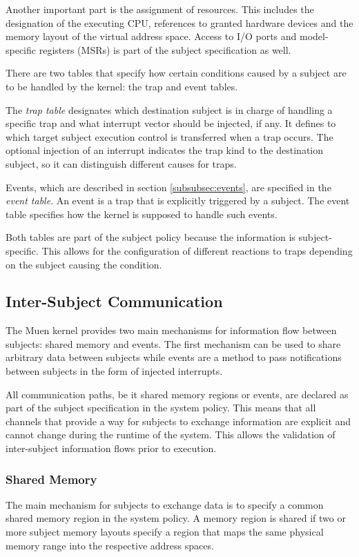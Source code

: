 Another important part is the assignment of resources. This includes the
designation of the executing CPU, references to granted hardware devices and the
memory layout of the virtual address space. Access to I/O ports and
model-specific registers (MSRs) is part of the subject specification as well.

There are two tables that specify how certain conditions caused by a subject
are to be handled by the kernel: the trap and event tables.

The \emph{trap table} designates which destination subject is in charge of
handling a specific trap and what interrupt vector should be injected, if any.
It defines to which target subject execution control is transferred when a trap
occurs. The optional injection of an interrupt indicates the trap kind to the
destination subject, so it can distinguish different causes for traps.

Events, which are described in section \ref{subsubsec:events}, are specified in
the \emph{event table}. An event is a trap that is explicitly triggered by a
subject. The event table specifies how the kernel is supposed to handle such
events.

Both tables are part of the subject policy because the information is
subject-specific. This allows for the configuration of different reactions to
traps depending on the subject causing the condition.

\subsection{Inter-Subject Communication}
The Muen kernel provides two main mechanisms for information flow between
subjects: shared memory and events. The first mechanism can be used to share
arbitrary data between subjects while events are a method to pass notifications
between subjects in the form of injected interrupts.

All communication paths, be it shared memory regions or events, are declared as
part of the subject specification in the system policy. This means that all
channels that provide a way for subjects to exchange information are explicit
and cannot change during the runtime of the system. This allows the validation
of inter-subject information flows prior to execution.

\subsubsection{Shared Memory}
The main mechanism for subjects to exchange data is to specify a common shared
memory region in the system policy. A memory region is shared if two or more
subject memory layouts specify a region that maps the same physical memory range
into the respective address spaces.

